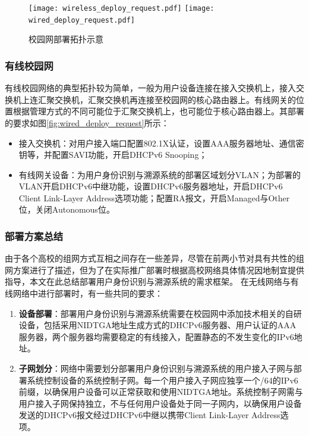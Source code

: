       \begin{figure}[ht]
        \centering
        {\texttt{[image: wireless\_deploy\_request.pdf]}}
        \hspace{2em}
        {\texttt{[image: wired\_deploy\_request.pdf]}}
        \caption{校园网部署拓扑示意}
      \end{figure}

      \subsubsection{有线校园网}
      \label{NIDTGA:DHCPv6:deploy:wired}
      有线校园网络的典型拓扑较为简单，一般为用户设备连接在接入交换机上，接入交换机上连汇聚交换机，汇聚交换机再连接至校园网的核心路由器上。有线网关的位置根据管理方式的不同可能位于汇聚交换机上，也可能位于核心路由器上。其部署的要求如图\ref{fig:wired_deploy_request}所示：
      \begin{itemize}
        \item 接入交换机：对用户接入端口配置802.1X认证，设置AAA服务器地址、通信密钥等，并配置SAVI功能，开启DHCPv6 Snooping；
        \item 有线网关设备：为用户身份识别与溯源系统的部署区域划分VLAN；为部署的VLAN开启DHCPv6中继功能，设置DHCPv6服务器地址，开启DHCPv6 Client Link-Layer Address选项功能；配置RA报文，开启Managed与Other位，关闭Autonomous位。
      \end{itemize}

      \subsubsection{部署方案总结}
      \label{NIDTGA:DHCPv6:deploy:summary}
      由于各个高校的组网方式互相之间存在一些差异，尽管在前两小节对具有共性的组网方案进行了描述，但为了在实际推广部署时根据高校网络具体情况因地制宜提供指导，本文在此总结部署用户身份识别与溯源系统的需求框架。
      在无线网络与有线网络中进行部署时，有一些共同的要求：
      \begin{enumerate}[1{)}]
        \item \textbf{设备部署}：部署用户身份识别与溯源系统需要在校园网中添加技术相关的自研设备，包括采用NIDTGA地址生成方式的DHCPv6服务器、用户认证的AAA服务器，两个服务器均需要稳定的有线接入，配置静态的不发生变化的IPv6地址。
        \item \textbf{子网划分}：网络中需要划分部署用户身份识别与溯源系统的用户接入子网与部署系统控制设备的系统控制子网。每一个用户接入子网应独享一个/64的IPv6前缀，以确保用户设备可以正常获取和使用NIDTGA地址。系统控制子网需与用户接入子网保持独立，不与任何用户设备处于同一子网内，以确保用户设备发送的DHCPv6报文经过DHCPv6中继以携带Client Link-Layer Address选项。
      \end{enumerate}

